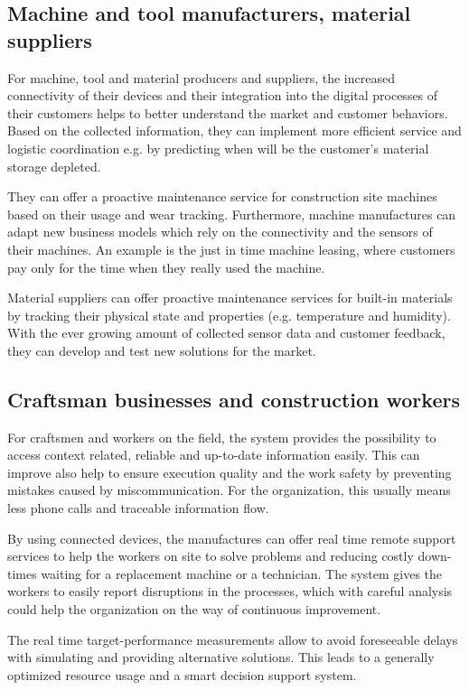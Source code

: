 \subsection{Machine and tool manufacturers, material suppliers}
For machine, tool and material producers and suppliers, the increased connectivity of their devices and their integration into the digital processes of their customers helps to better understand the market and customer behaviors. 
Based on the collected information, they can implement more efficient service and logistic coordination e.g. by predicting when will be the customer's material storage depleted.

They can offer a proactive maintenance service for construction site machines based on their usage and wear tracking. 
Furthermore, machine manufactures can adapt new business models which rely on the connectivity and the sensors of their machines. An example is the just in time machine leasing, where customers pay only for the time when they really used the machine.

Material suppliers can offer proactive maintenance services for built-in materials by tracking their physical state and properties (e.g. temperature and humidity).
With the ever growing amount of collected sensor data and customer feedback, they can develop and test new solutions for the market.


\subsection{Craftsman businesses and construction workers}
For craftsmen and workers on the field, the system provides the possibility to access context related, reliable and up-to-date information easily. 
This can improve also help to ensure execution quality and the work safety by preventing mistakes caused by miscommunication.
For the organization, this usually means less phone calls and traceable information flow.

By using connected devices, the manufactures can offer real time remote support services to help the workers on site to solve problems and reducing costly down-times waiting for a replacement machine or a technician.
The system gives the workers to easily report disruptions in the processes, which with careful analysis could help the organization on the way of continuous improvement.

The real time target-performance measurements allow to avoid foreseeable delays with simulating and providing alternative solutions. This leads to a generally optimized resource usage and a smart decision support system.


